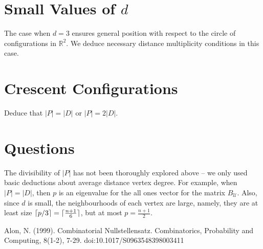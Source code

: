 \documentclass[12pt]{article}
\newcommand{\R}{\mathbb{R}}
\DeclarePairedDelimiter\ceil{\lceil}{\rceil}
\theoremstyle{definition}
\begin{document}
	\section{Small Values of $d$}
	
	The case when $d=3$ ensures general position with respect to the circle of configurations in $\R^2$.  We deduce necessary distance multiplicity conditions in this case.
	
	\section{Crescent Configurations}
	
	Deduce that $|P| = |D|$ or $|P| = 2|D|$.
	
	\section{Questions}
	
	The divisibility of $|P|$ has not been thoroughly explored above -- we only used basic deductions about average distance vertex degree.  For example, when $|P| = |D|$, then $p$ is an eigenvalue for the all ones vector for the matrix $B_{\mathcal{U}}$.  Also, since $d$ is small, the neighbourhoods of each vertex are large, namely, they are at least size $\ceil{p/3} = \ceil{\tfrac{n+1}{6}}$, but at most $p = \tfrac{n+1}{2}$.
	
	\newpage
	\begin{thebibliography}{100}
		 Alon, N. (1999). Combinatorial Nullstellensatz. Combinatorics, Probability and Computing, 8(1-2), 7-29. doi:10.1017/S0963548398003411
	\end{thebibliography}
	
\end{document}
